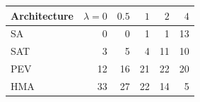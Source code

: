 \begin{tabular}{lrrrrr}
\toprule
Architecture & $\lambda=0$ & $0.5$ & $1$ & $2$ & $4$ \\
\midrule
SA & 0 & 0 & 1 & 1 & 13 \\
SAT & 3 & 5 & 4 & 11 & 10 \\
PEV & 12 & 16 & 21 & 22 & 20 \\
HMA & 33 & 27 & 22 & 14 & 5 \\
\bottomrule
\end{tabular}
